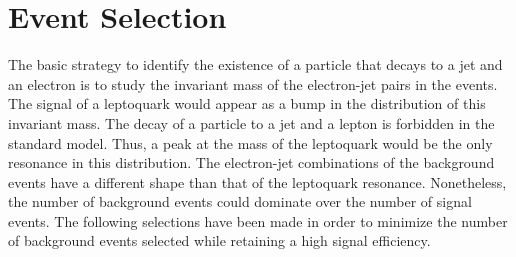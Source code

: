 %

\section{Event Selection} \label{sec:eventSelection}


The basic strategy to identify the existence of a particle that decays to a jet and an electron 
is to study the invariant mass of the electron-jet pairs in the events. 
The signal of a leptoquark would appear as a bump in the distribution of this invariant mass.
The decay of a particle to a jet and a lepton is forbidden in the standard model.  
Thus, a peak at the mass of the leptoquark would be the only resonance in this distribution. 
The electron-jet combinations of the background events have a different shape than that 
of the leptoquark resonance. 
Nonetheless, the number of background events could dominate over the number of signal events.  
The following selections have been made in order to minimize the number of background events 
selected while retaining a high signal efficiency.

